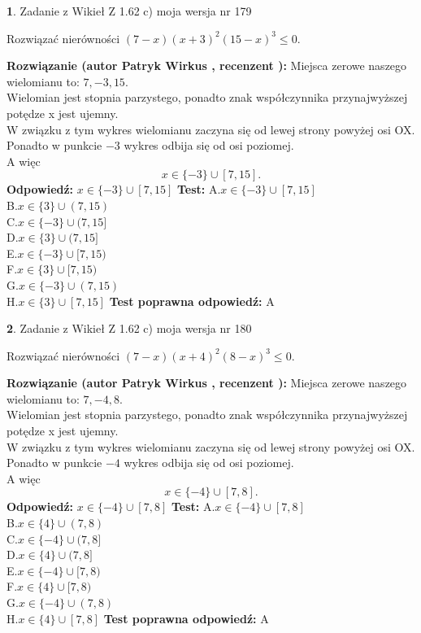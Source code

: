 \documentclass[12pt, a4paper]{article}
\theoremstyle{definition} %
\newtheorem{zad}{}
\newcommand{\zadStart}[1]{\begin{zad}#1\newline}
\newcommand{\zadStop}{\end{zad}}
\newcommand{\rozwStart}[2]{\noindent \textbf{Rozwiązanie (autor #1 , recenzent #2): }\newline}
\newcommand{\rozwStop}{\newline}
\newcommand{\odpStart}{\noindent \textbf{Odpowiedź:}\newline}
\newcommand{\odpStop}{\newline}
\newcommand{\testStart}{\noindent \textbf{Test:}\newline}
\newcommand{\testStop}{\newline}
\newcommand{\kluczStart}{\noindent \textbf{Test poprawna odpowiedź:}\newline}
\newcommand{\kluczStop}{\newline}
\begin{document}
\zadStart{Zadanie z Wikieł Z 1.62 c) moja wersja nr 179}

Rozwiązać nierówności $(7-x)(x+3)^{2}(15-x)^{3}\le0$.
\zadStop
\rozwStart{Patryk Wirkus}{}
Miejsca zerowe naszego wielomianu to: $7, -3, 15$.\\
Wielomian jest stopnia parzystego, ponadto znak współczynnika przy\linebreak najwyższej potędze x jest ujemny.\\ W związku z tym wykres wielomianu zaczyna się od lewej strony powyżej osi OX.\\
Ponadto w punkcie $-3$ wykres odbija się od osi poziomej.\\
A więc $$x \in \{-3\} \cup [7,15].$$
\rozwStop
\odpStart
$x \in \{-3\} \cup [7,15]$
\odpStop
\testStart
A.$x \in \{-3\} \cup [7,15]$\\
B.$x \in \{3\} \cup (7,15)$\\
C.$x \in \{-3\} \cup (7,15]$\\
D.$x \in \{3\} \cup (7,15]$\\
E.$x \in \{-3\} \cup [7,15)$\\
F.$x \in \{3\} \cup [7,15)$\\
G.$x \in \{-3\} \cup (7,15)$\\
H.$x \in \{3\} \cup [7,15]$
\testStop
\kluczStart
A
\kluczStop



\zadStart{Zadanie z Wikieł Z 1.62 c) moja wersja nr 180}

Rozwiązać nierówności $(7-x)(x+4)^{2}(8-x)^{3}\le0$.
\zadStop
\rozwStart{Patryk Wirkus}{}
Miejsca zerowe naszego wielomianu to: $7, -4, 8$.\\
Wielomian jest stopnia parzystego, ponadto znak współczynnika przy\linebreak najwyższej potędze x jest ujemny.\\ W związku z tym wykres wielomianu zaczyna się od lewej strony powyżej osi OX.\\
Ponadto w punkcie $-4$ wykres odbija się od osi poziomej.\\
A więc $$x \in \{-4\} \cup [7,8].$$
\rozwStop
\odpStart
$x \in \{-4\} \cup [7,8]$
\odpStop
\testStart
A.$x \in \{-4\} \cup [7,8]$\\
B.$x \in \{4\} \cup (7,8)$\\
C.$x \in \{-4\} \cup (7,8]$\\
D.$x \in \{4\} \cup (7,8]$\\
E.$x \in \{-4\} \cup [7,8)$\\
F.$x \in \{4\} \cup [7,8)$\\
G.$x \in \{-4\} \cup (7,8)$\\
H.$x \in \{4\} \cup [7,8]$
\testStop
\kluczStart
A
\kluczStop
\end{document}

